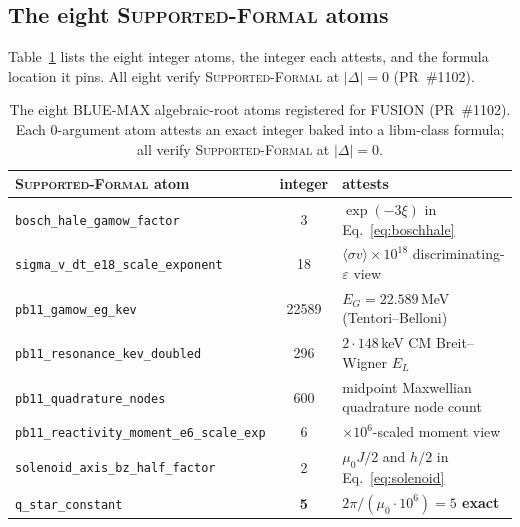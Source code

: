 \subsection{The eight \textsc{Supported-Formal} atoms}
\label{app:bluemax:positive}

Table~\ref{tab:app:bluemax} lists the eight integer atoms, the integer each
attests, and the formula location it pins. All eight verify
\textsc{Supported-Formal} at $|\Delta|=0$ (PR~\#1102).

\begin{table}[h]
\centering
\small
\begin{tabular}{lcl}
\toprule
\textsc{Supported-Formal} atom & integer & attests \\
\midrule
\verb|bosch_hale_gamow_factor|             & 3     & $\exp(-3\xi)$ in Eq.~\eqref{eq:boschhale} \\
\verb|sigma_v_dt_e18_scale_exponent|       & 18    & $\langle\sigma v\rangle\!\times\!10^{18}$ discriminating-$\varepsilon$ view \\
\verb|pb11_gamow_eg_kev|                   & 22589 & $E_G = 22.589$\,MeV (Tentori--Belloni) \\
\verb|pb11_resonance_kev_doubled|          & 296   & $2\cdot148$\,keV CM Breit--Wigner $E_L$ \\
\verb|pb11_quadrature_nodes|               & 600   & midpoint Maxwellian quadrature node count \\
\verb|pb11_reactivity_moment_e6_scale_exp| & 6     & $\times10^{6}$-scaled moment view \\
\verb|solenoid_axis_bz_half_factor|        & 2     & $\mu_0 J/2$ and $h/2$ in Eq.~\eqref{eq:solenoid} \\
\verb|q_star_constant|                     & \textbf{5} & \textbf{$2\pi/(\mu_0\!\cdot\!10^{6}) = 5$ exact} \\
\bottomrule
\end{tabular}
\caption{The eight BLUE-MAX algebraic-root atoms registered for FUSION
(PR~\#1102). Each $0$-argument atom attests an exact integer baked into a
libm-class formula; all verify \textsc{Supported-Formal} at $|\Delta|=0$.}
\label{tab:app:bluemax}
\end{table}

